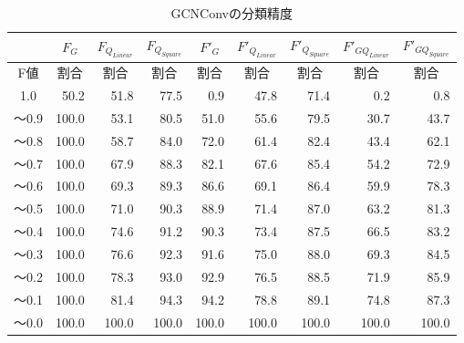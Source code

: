 \begin{table}[tb]
\caption{GCNConvの分類精度}\label{tbl:result_gcnconv}
\centering
\begin{tabular}{|c|r|r|r|r|r|r|r|r|}\hline
  & \multicolumn{1}{|c|}{$F_{G}$} & \multicolumn{1}{|c|}{$F_{Q_{Linear}}$} & \multicolumn{1}{|c|}{$F_{Q_{Square}}$} & \multicolumn{1}{|c|}{$F'_{G}$} & \multicolumn{1}{|c|}{${F'}_{Q_{Linear}}$} & \multicolumn{1}{|c|}{${F'}_{Q_{Square}}$} & \multicolumn{1}{|c|}{${F'}_{GQ_{Linear}}$} & \multicolumn{1}{|c|}{${F'}_{GQ_{Square}}$}\\
  \hline
  \multicolumn{1}{|c|}{F値} & \multicolumn{1}{|c|}{割合} & \multicolumn{1}{|c|}{割合} & \multicolumn{1}{|c|}{割合} & \multicolumn{1}{|c|}{割合} & \multicolumn{1}{|c|}{割合} & \multicolumn{1}{|c|}{割合} & \multicolumn{1}{|c|}{割合} & \multicolumn{1}{|c|}{割合} \\
  \hline
  1.0   & 50.2 & 51.8 & 77.5 & 0.9 & 47.8 & 71.4 & 0.2 & 0.8 \\
  〜0.9 & 100.0 & 53.1 & 80.5 & 51.0 & 55.6 & 79.5 & 30.7 & 43.7 \\
  〜0.8 & 100.0 & 58.7 & 84.0 & 72.0 & 61.4 & 82.4 & 43.4 & 62.1 \\
  〜0.7 & 100.0 & 67.9 & 88.3 & 82.1 & 67.6 & 85.4 & 54.2 & 72.9 \\
  〜0.6 & 100.0 & 69.3 & 89.3 & 86.6 & 69.1 & 86.4 & 59.9 & 78.3 \\
  〜0.5 & 100.0 & 71.0 & 90.3 & 88.9 & 71.4 & 87.0 & 63.2 & 81.3 \\
  〜0.4 & 100.0 & 74.6 & 91.2 & 90.3 & 73.4 & 87.5 & 66.5 & 83.2 \\
  〜0.3 & 100.0 & 76.6 & 92.3 & 91.6 & 75.0 & 88.0 & 69.3 & 84.5 \\
  〜0.2 & 100.0 & 78.3 & 93.0 & 92.9 & 76.5 & 88.5 & 71.9 & 85.9 \\
  〜0.1 & 100.0 & 81.4 & 94.3 & 94.2 & 78.8 & 89.1 & 74.8 & 87.3 \\
  〜0.0 & 100.0 & 100.0 & 100.0 & 100.0 & 100.0 & 100.0 & 100.0 & 100.0 \\
  \hline
\end{tabular}
\end{table}

